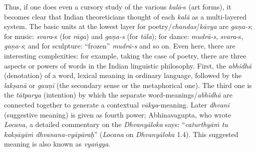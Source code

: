 Thus, if one does even a cursory study of the various \textsl{kalā}-s (art forms), it becomes clear that Indian theoreticians thought of each \textsl{kalā} as a multi-layered system. The basic units at the lowest layer for poetry/\textsl{chandas}/\textsl{kāvya} are \textsl{gaṇa-s}; for music: \textsl{svara}-s (for \textsl{rāga}) and \textsl{gaṇa-s} (for \textsl{tāla}); for dance: \textsl{mudrā-s}, \textsl{svara}-s, \textsl{gaṇa-s}; and for sculpture: “frozen” \textsl{mudrā-s} and so on. Even here, there are interesting complexities: for example, taking the case of poetry, there are three aspects or powers of words in the Indian linguistic philosophy. First, the \textsl{abhidhā} (denotation) of a word, lexical meaning in ordinary language, followed by the \textsl{lakṣanā} or \textsl{gauṇī} (the secondary sense or the metaphorical one). The third one is the \textsl{tātparya} (intention) by which the separate word-meanings/\textsl{abhidhā} are connected together to generate a contextual \textsl{vākya}-meaning. Later \textsl{dhvani} (suggestive meaning) is given as fourth power; Abhinavagupta, who wrote \textsl{Locana}, a detailed commentary on the \textsl{Dhvanyāloka} says: “\textsl{caturthyāṁ tu kakṣāyāṁ dhvanana-vyāpāraḥ}” (\textsl{Locana} on \textsl{Dhvanyāloka} 1.4). This suggested meaning is also known as \textsl{vyaṅgya}.

